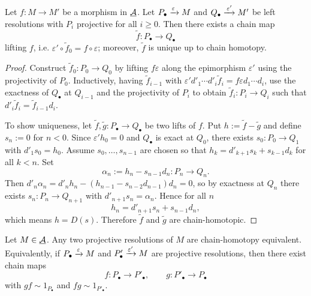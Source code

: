 \begin{proposition*}
	Let \( f: M \to M' \) be a morphism in \( \underline{\mathcal{A}} \). Let \( P_{\bullet} \xrightarrow{\varepsilon\,} M \) and \( Q_{\bullet} \xrightarrow{\,\varepsilon'} M' \) be left resolutions with \( P_i \) projective for all \( i \ge 0 \). Then there exists a chain map
	\[
		\tilde f: P_{\bullet} \to Q_{\bullet}
	\]
	lifting \( f \), i.e. \( \varepsilon' \circ \tilde f_0 = f \circ \varepsilon \); moreover, \( \tilde f \) is unique up to chain homotopy.
\end{proposition*}
\begin{proof}
	Construct \( \tilde f_0: P_0 \to Q_0 \) by lifting \( f\varepsilon \) along the epimorphism \( \varepsilon' \) using the projectivity of \( P_0 \). Inductively, having \( \tilde f_{i-1} \) with \( \varepsilon' d'_1 \dotsm d'_i \tilde f_i = f \varepsilon d_1 \dotsm d_i \), use the exactness of \( Q_{\bullet} \) at \( Q_{i-1} \) and the projectivity of \( P_i \) to obtain \( \tilde f_i: P_i \to Q_i \) such that \( d'_i \tilde f_i = \tilde f_{i-1} d_i \).

	\vspace*{2mm}

	To show uniqueness, let \( \tilde f, \tilde g: P_{\bullet} \to Q_{\bullet} \) be two lifts of \( f \). Put \( h := \tilde f - \tilde g \) and define \( s_n := 0 \) for \( n<0 \). Since \( \varepsilon' h_0 = 0 \) and \( Q_{\bullet} \) is exact at \( Q_0 \), there exists \( s_0: P_0 \to Q_1 \) with \( d'_1 s_0 = h_0 \).
	Assume \( s_0,\dots,s_{n-1} \) are chosen so that \( h_k = d'_{k+1} s_k + s_{k-1} d_k \) for all \( k<n \). Set
	\[
		\alpha_n := h_n - s_{n-1} d_n : P_n \to Q_n .
	\]
	Then \( d'_n \alpha_n = d'_n h_n - (h_{n-1} - s_{n-2} d_{n-1}) d_n = 0 \), so by exactness at \( Q_n \) there exists \( s_n: P_n \to Q_{n+1} \) with \( d'_{n+1} s_n = \alpha_n \). Hence for all \( n \)
	\[
		h_n = d'_{n+1} s_n + s_{n-1} d_n ,
	\]
	which means \( h = D(s) \). Therefore \( \tilde f \) and \( \tilde g \) are chain-homotopic.\qedhere
\end{proof}

\begin{corollary*}
	Let \( M \in \underline{\mathcal{A}} \). Any two projective resolutions of \( M \) are chain-homotopy equivalent. Equivalently, if \( P_{\bullet} \xrightarrow{\varepsilon} M \) and \( P'_{\bullet} \xrightarrow{\varepsilon'} M \) are projective resolutions, then there exist chain maps
	\[
		f: P_{\bullet} \to P'_{\bullet}, \qquad g: P'_{\bullet} \to P_{\bullet}
	\]
	with \( g f \sim 1_{P_{\bullet}} \) and \( f g \sim 1_{P'_{\bullet}} \).
\end{corollary*}